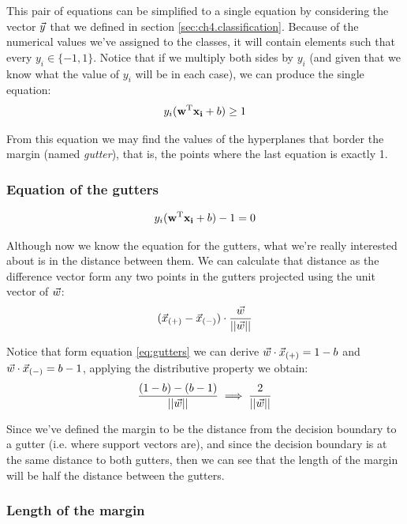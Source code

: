 This pair of equations can be simplified to a single equation by considering the vector $\vec{y}$ that we defined in section \ref{sec:ch4.classification}. Because of the numerical values we've assigned to the classes, it will contain elements such that every $y_i \in \{-1, 1\}$. Notice that if we multiply both sides by $y_i$ (and given that we know what the value of $y_i$ will be in each case), we can produce the single equation:
\begin{align}\label{eq:svmconstrain}
    y_i (\mathbf{w}^{\text{T}} \mathbf{x_i} + b) \ge 1
\end{align}

From this equation we may find the values of the hyperplanes that border the margin (named \emph{gutter}), that is, the points where the last equation is exactly 1. 

\subsubsection*{Equation of the gutters}
\begin{align}\label{eq:gutters}
    y_i (\mathbf{w}^{\text{T}} \mathbf{x_i} + b) -1 = 0
\end{align}

Although now we know the equation for the gutters, what we're really interested about is in the distance between them. We can calculate that distance as the diff\-erence vector form any two points in the gutters projected using the unit vector of $\vec{w}$:
\begin{align*}
    (\vec{x}_{(+)} - \vec{x}_{(-)}) \cdot \frac{\vec{w}}{||\vec{w}||}
\end{align*}

Notice that form equation \ref{eq:gutters} we can derive $\vec{w} \cdot \vec{x}_{(+)} = 1 - b$ and $\vec{w} \cdot \vec{x}_{(-)} = b - 1$, applying the distributive property we obtain:
\begin{align*}
    \frac{(1 - b) - (b - 1)}{||\vec{w}||} \implies \frac{2}{||\vec{w}||}
\end{align*}

Since we've defined the margin to be the distance from the decision boundary to a gutter (i.e. where support vectors are), and since the decision boundary is at the same distance to both gutters, then we can see that the length of the margin will be half the distance between the gutters.

\subsubsection*{Length of the margin}

